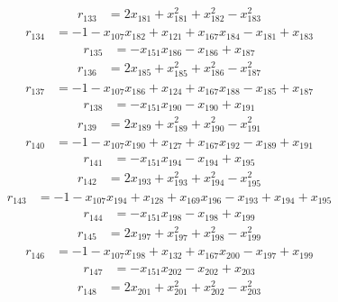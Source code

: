 \[\begin{aligned}
r_{133}&=2x_{181}+x_{181}^{2}+x_{182}^{2}-x_{183}^{2}
\end{aligned}\]
\[\begin{aligned}
r_{134}&=-1-x_{107}x_{182}+x_{121}+x_{167}x_{184}-x_{181}+x_{183}
\end{aligned}\]
\[\begin{aligned}
r_{135}&=-x_{151}x_{186}-x_{186}+x_{187}
\end{aligned}\]
\[\begin{aligned}
r_{136}&=2x_{185}+x_{185}^{2}+x_{186}^{2}-x_{187}^{2}
\end{aligned}\]
\[\begin{aligned}
r_{137}&=-1-x_{107}x_{186}+x_{124}+x_{167}x_{188}-x_{185}+x_{187}
\end{aligned}\]
\[\begin{aligned}
r_{138}&=-x_{151}x_{190}-x_{190}+x_{191}
\end{aligned}\]
\[\begin{aligned}
r_{139}&=2x_{189}+x_{189}^{2}+x_{190}^{2}-x_{191}^{2}
\end{aligned}\]
\[\begin{aligned}
r_{140}&=-1-x_{107}x_{190}+x_{127}+x_{167}x_{192}-x_{189}+x_{191}
\end{aligned}\]
\[\begin{aligned}
r_{141}&=-x_{151}x_{194}-x_{194}+x_{195}
\end{aligned}\]
\[\begin{aligned}
r_{142}&=2x_{193}+x_{193}^{2}+x_{194}^{2}-x_{195}^{2}
\end{aligned}\]
\[\begin{aligned}
r_{143}&=-1-x_{107}x_{194}+x_{128}+x_{169}x_{196}-x_{193}+x_{194}+x_{195}
\end{aligned}\]
\[\begin{aligned}
r_{144}&=-x_{151}x_{198}-x_{198}+x_{199}
\end{aligned}\]
\[\begin{aligned}
r_{145}&=2x_{197}+x_{197}^{2}+x_{198}^{2}-x_{199}^{2}
\end{aligned}\]
\[\begin{aligned}
r_{146}&=-1-x_{107}x_{198}+x_{132}+x_{167}x_{200}-x_{197}+x_{199}
\end{aligned}\]
\[\begin{aligned}
r_{147}&=-x_{151}x_{202}-x_{202}+x_{203}
\end{aligned}\]
\[\begin{aligned}
r_{148}&=2x_{201}+x_{201}^{2}+x_{202}^{2}-x_{203}^{2}
\end{aligned}\]
